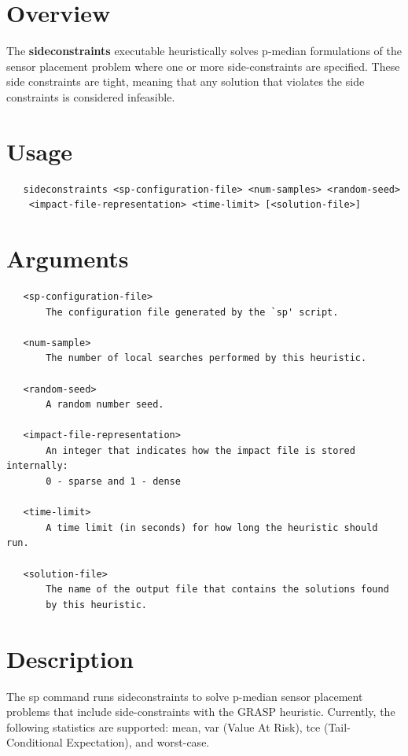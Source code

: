 \section{Overview}\label{sideconstraintsExecutable_sideconstraintsOverview}

The {\bfseries sideconstraints} executable heuristically solves p-\/median formulations of the sensor placement problem where one or more side-\/constraints are specified. These side constraints are tight, meaning that any solution that violates the side constraints is considered infeasible.

\section{Usage}\label{sideconstraintsExecutable_sideconstraintsUsage}

\begin{verbatim}
   sideconstraints <sp-configuration-file> <num-samples> <random-seed> 
	<impact-file-representation> <time-limit> [<solution-file>]
\end{verbatim}

\section{Arguments}\label{sideconstraintsExecutable_sideconstraintsArgs}

\begin{verbatim} 
   <sp-configuration-file>
	   The configuration file generated by the `sp' script.

   <num-sample>
	   The number of local searches performed by this heuristic.

   <random-seed>
	   A random number seed.

   <impact-file-representation>
	   An integer that indicates how the impact file is stored internally:
	   0 - sparse and 1 - dense

   <time-limit>
	   A time limit (in seconds) for how long the heuristic should run.

   <solution-file>
	   The name of the output file that contains the solutions found
	   by this heuristic.
\end{verbatim}

\section{Description}\label{sideconstraintsExecutable_sideconstraintsDescription}

The {\ttfamily sp} command runs {\ttfamily sideconstraints} to solve p-\/median sensor placement problems that include side-\/constraints with the GRASP heuristic. Currently, the following statistics are supported: mean, var (Value At Risk), tce (Tail-\/Conditional Expectation), and worst-\/case.

